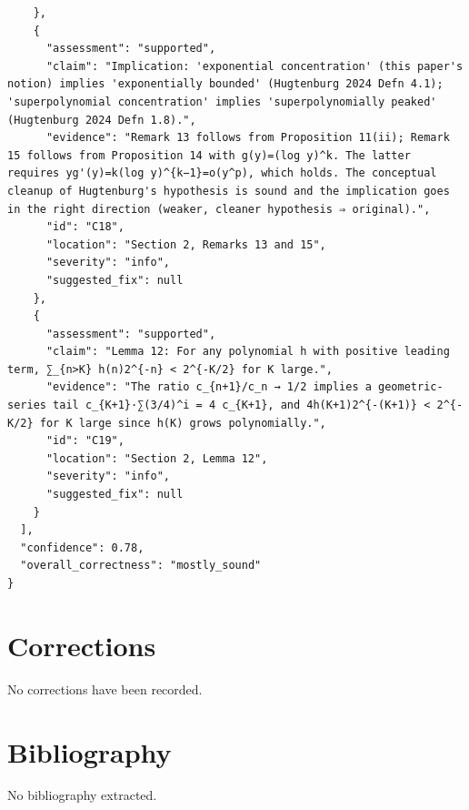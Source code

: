 \documentclass[11pt]{article}
\begin{document}
\begin{verbatim}
    },
    {
      "assessment": "supported",
      "claim": "Implication: 'exponential concentration' (this paper's notion) implies 'exponentially bounded' (Hugtenburg 2024 Defn 4.1); 'superpolynomial concentration' implies 'superpolynomially peaked' (Hugtenburg 2024 Defn 1.8).",
      "evidence": "Remark 13 follows from Proposition 11(ii); Remark 15 follows from Proposition 14 with g(y)=(log y)^k. The latter requires yg'(y)=k(log y)^{k−1}=o(y^p), which holds. The conceptual cleanup of Hugtenburg's hypothesis is sound and the implication goes in the right direction (weaker, cleaner hypothesis ⇒ original).",
      "id": "C18",
      "location": "Section 2, Remarks 13 and 15",
      "severity": "info",
      "suggested_fix": null
    },
    {
      "assessment": "supported",
      "claim": "Lemma 12: For any polynomial h with positive leading term, ∑_{n>K} h(n)2^{-n} < 2^{-K/2} for K large.",
      "evidence": "The ratio c_{n+1}/c_n → 1/2 implies a geometric-series tail c_{K+1}·∑(3/4)^i = 4 c_{K+1}, and 4h(K+1)2^{-(K+1)} < 2^{-K/2} for K large since h(K) grows polynomially.",
      "id": "C19",
      "location": "Section 2, Lemma 12",
      "severity": "info",
      "suggested_fix": null
    }
  ],
  "confidence": 0.78,
  "overall_correctness": "mostly_sound"
}
\end{verbatim}

\section*{Corrections}
No corrections have been recorded.

\section*{Bibliography}
No bibliography extracted.

% 
% 
\end{document}
